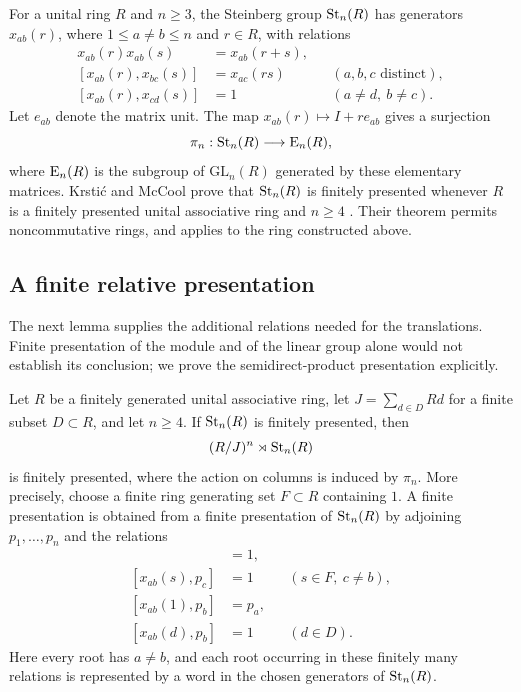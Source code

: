 For a unital ring $R$ and $n\geq3$, the Steinberg group $\operatorname{St}_n(R)$
has generators $x_{ab}(r)$, where $1\leq a\ne b\leq n$ and $r\in R$,
with relations
\begin{align}
 x_{ab}(r)x_{ab}(s)&=x_{ab}(r+s),\label{eq:steinberg-add}\\
 [x_{ab}(r),x_{bc}(s)]&=x_{ac}(rs)
       &&(a,b,c\text{ distinct}),\label{eq:steinberg-product}\\
 [x_{ab}(r),x_{cd}(s)]&=1
       &&(a\ne d,\ b\ne c).\label{eq:steinberg-commute}
\end{align}
Let $e_{ab}$ denote the matrix unit.  The map
$x_{ab}(r)\mapsto I+r e_{ab}$ gives a surjection
\[
 \pi_n:\operatorname{St}_n(R)\longrightarrow\operatorname{E}_n(R),
\]
where $\operatorname{E}_n(R)$ is the subgroup of $\mathrm{GL}_n(R)$ generated by
these elementary matrices.  Krsti\'c and McCool prove that
$\operatorname{St}_n(R)$ is finitely presented whenever $R$ is a finitely presented
unital associative ring and $n\geq4$
\cite[Theorem~3]{KrsticMcCool1999}.  Their theorem permits
noncommutative rings, and applies to the ring constructed above.

\subsection{A finite relative presentation}

The next lemma supplies the additional relations needed for the
translations.  Finite presentation of the module and of the linear
group alone would not establish its conclusion; we prove the
semidirect-product presentation explicitly.

\begin{lemma}\label{lem:affine-presentation}
Let $R$ be a finitely generated unital associative ring, let
$J=\sum_{d\in D}Rd$ for a finite subset $D\subset R$, and let $n\geq4$.
If $\operatorname{St}_n(R)$ is finitely presented, then
\[
 (R/J)^n\rtimes\operatorname{St}_n(R)
\]
is finitely presented, where the action on columns is induced by
$\pi_n$.  More precisely, choose a finite ring generating set
$F\subset R$ containing $1$.  A finite presentation is obtained
from a finite presentation of $\operatorname{St}_n(R)$ by adjoining
$p_1,\ldots,p_n$ and the relations
\begin{align}
 [p_a,p_b]&=1,\label{eq:affine-p}\\
 [x_{ab}(s),p_c]&=1
     &&(s\in F,\ c\ne b),\label{eq:affine-central}\\
 [x_{ab}(1),p_b]&=p_a,\label{eq:affine-unit}\\
 [x_{ab}(d),p_b]&=1
     &&(d\in D).\label{eq:affine-ideal}
\end{align}
Here every root has $a\ne b$, and each root occurring in these
finitely many relations is represented by a word in the chosen
generators of $\operatorname{St}_n(R)$.
\end{lemma}


